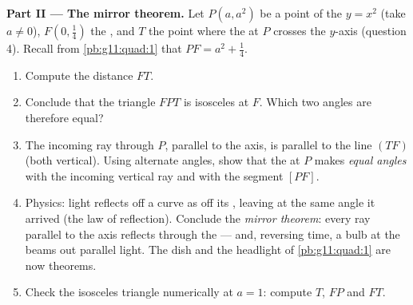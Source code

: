 \begin{problem}
\medskip
\noindent\textbf{Part II --- The mirror theorem.}
Let $P(a, a^2)$ be a point of the  $y = x^2$ (take
$a \neq 0$), $F\left(0, \frac14\right)$ the , and $T$ the
point where the  at $P$ crosses the $y$-axis (question
4). Recall from \cref{pb:g11:quad:1} that
$PF = a^2 + \frac14$.
\begin{enumerate}[resume]
  \item Compute the distance $FT$.
  \item Conclude that the triangle $FPT$ is isosceles at $F$.
        Which two angles are therefore equal?
  \item The incoming ray through $P$, parallel to the axis, is
        parallel to the line $(TF)$ (both vertical). Using
        alternate angles, show that the  at $P$ makes
        \emph{equal angles} with the incoming vertical ray and
        with the segment $[PF]$.
  \item Physics: light reflects off a curve as off its ,
        leaving at the same angle it arrived (the law of
        reflection). Conclude the \emph{mirror theorem}: every
        ray parallel to the axis reflects through the  ---
        and, reversing time, a bulb at the  beams out
        parallel light. The dish and the headlight of
        \cref{pb:g11:quad:1} are now theorems.
  \item Check the isosceles triangle numerically at $a = 1$:
        compute $T$, $FP$ and $FT$.
\end{enumerate}


\end{problem}
